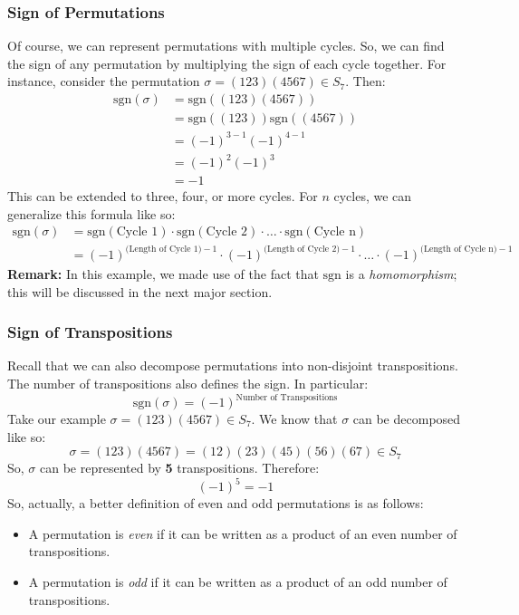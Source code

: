 \documentclass[letterpaper]{article}
\begin{document}
\subsubsection{Sign of Permutations}
Of course, we can represent permutations with multiple cycles. So, we can find the sign of any permutation by multiplying the sign of each cycle together. For instance, consider the permutation $\sigma = (123)(4567) \in S_7$. Then: 
\begin{equation*}
    \begin{aligned}
        \text{sgn}(\sigma) &= \text{sgn}((123)(4567)) \\ 
            &= \text{sgn}((123)) \text{sgn}((4567)) \\ 
            &= (-1)^{3 - 1} (-1)^{4 - 1} \\ 
            &= (-1)^2 (-1)^3 \\ 
            &= -1
    \end{aligned}
\end{equation*}
This can be extended to three, four, or more cycles. For $n$ cycles, we can generalize this formula like so: 
\begin{equation*}
    \begin{aligned}
        \text{sgn}(\sigma) &= \text{sgn}(\text{Cycle 1}) \cdot \text{sgn}(\text{Cycle 2}) \cdot \ldots \cdot \text{sgn}(\text{Cycle n}) \\
            &= (-1)^{\text{(Length of Cycle 1)} - 1} \cdot (-1)^{\text{(Length of Cycle 2)} - 1} \cdot \ldots \cdot (-1)^{\text{(Length of Cycle n)} - 1}
    \end{aligned}
\end{equation*}
\textbf{Remark:} In this example, we made use of the fact that $\text{sgn}$ is a \emph{homomorphism}; this will be discussed in the next major section. 

\subsubsection{Sign of Transpositions}
Recall that we can also decompose permutations into non-disjoint transpositions. The number of transpositions also defines the sign. In particular: 
\[\text{sgn}(\sigma) = (-1)^{\text{Number of Transpositions}}\]
Take our example $\sigma = (123)(4567) \in S_7$. We know that $\sigma$ can be decomposed like so: 
\[\sigma = (123)(4567) = (12)(23)(45)(56)(67) \in S_7\]
So, $\sigma$ can be represented by \textbf{5} transpositions. Therefore:
\[(-1)^{5} = -1\]
So, actually, a better definition of even and odd permutations is as follows: 
\begin{itemize}
    \item A permutation is \emph{even} if it can be written as a product of an even number of transpositions. 
    \item A permutation is \emph{odd} if it can be written as a product of an odd number of transpositions.
\end{itemize}
\end{document}
